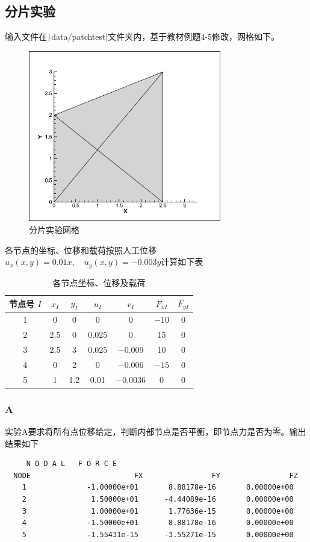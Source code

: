 \documentclass[12pt,a4paper]{article}
\newcommand{\code}{\texttt}
\begin{document}
\subsection{分片实验}
输入文件在\code|data/patchtest|文件夹内，基于教材例题4-5\cite{zhang2003}修改，网格如下。
\begin{figure}[H]
    \centering
    \includegraphics[width=0.75\textwidth]{mesh.png}
    \caption{分片实验网格}
\end{figure}
各节点的坐标、位移和载荷按照人工位移
$u_x(x,y) = 0.01x,\quad u_y(x,y) = -0.003y$计算如下表
\begin{table}[H]
\centering
\caption{各节点坐标、位移及载荷}
\begin{tabular}{|c|c|c|c|c|c|c|}
\hline
节点号 $I$ & $x_I$ & $y_I$ & $u_I$ & $v_I$ & $F_{xI}$ & $F_{yI}$ \\ 
\hline
1 & 0 & 0 & 0 & 0 & $-10$ & 0 \\ 
\hline
2 & 2.5 & 0 & 0.025 & 0 & 15 & 0 \\ 
\hline
3 & 2.5 & 3 & 0.025 & $-0.009$ & 10 & 0 \\ 
\hline
4 & 0 & 2 & 0 & $-0.006$ & $-15$ & 0 \\ 
\hline
5 & 1 & 1.2 & 0.01 & $-0.0036$ & 0 & 0 \\ 
\hline
\end{tabular}
\label{tab:node_data}
\end{table}

\subsubsection{A}
实验A要求将所有点位移给定，判断内部节点是否平衡，即节点力是否为零。输出结果如下
\begin{verbatim}
     N O D A L   F O R C E 
  NODE                        FX                FY                FZ
    1              -1.00000e+01       8.88178e-16       0.00000e+00
    2               1.50000e+01      -4.44089e-16       0.00000e+00
    3               1.00000e+01       1.77636e-15       0.00000e+00
    4              -1.50000e+01       8.88178e-16       0.00000e+00
    5              -1.55431e-15      -3.55271e-15       0.00000e+00
\end{verbatim}
\end{document}
